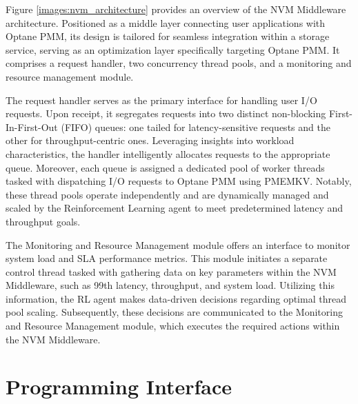 Figure \ref{images:nvm_architecture} provides an overview of the NVM Middleware architecture. Positioned as a middle layer connecting user applications with Optane PMM, its design is tailored for seamless integration within a storage service, serving as an optimization layer specifically targeting Optane PMM. It comprises a request handler, two concurrency thread pools, and a monitoring and resource management module.

The request handler serves as the primary interface for handling user I/O requests. Upon receipt, it segregates requests into two distinct non-blocking First-In-First-Out (FIFO) queues: one tailed for latency-sensitive requests and the other for throughput-centric ones. Leveraging insights into workload characteristics, the handler intelligently allocates requests to the appropriate queue. Moreover, each queue is assigned a dedicated pool of worker threads tasked with dispatching I/O requests to Optane PMM using PMEMKV. Notably, these thread pools operate independently and are dynamically managed and scaled by the Reinforcement Learning agent to meet predetermined latency and throughput goals.

The Monitoring and Resource Management module offers an interface to monitor system load and SLA performance metrics. This module initiates a separate control thread tasked with gathering data on key parameters within the NVM Middleware, such as 99th latency, throughput, and system load. Utilizing this information, the RL agent makes data-driven decisions regarding optimal thread pool scaling. Subsequently, these decisions are communicated to the Monitoring and Resource Management module, which executes the required actions within the NVM Middleware.

\section{Programming Interface}

